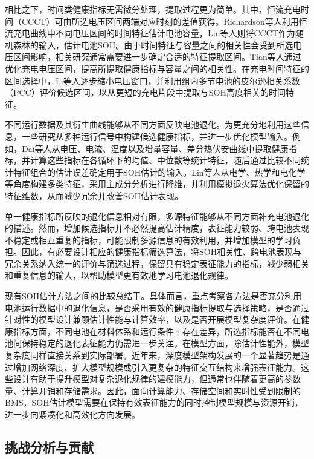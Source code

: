相比之下，时间类健康指标无需微分处理，提取过程更为简单。其中，恒流充电时间（CCCT）可由所选电压区间两端对应时刻的差值获得。Richardson等人\cite{ref28}利用恒流充电曲线中不同电压区间的时间特征估计电池容量，Lin等人\cite{ref63}则将CCCT作为随机森林的输入，估计电池SOH。由于时间特征与容量之间的相关性会受到所选电压区间影响，相关研究通常需要进一步确定合适的特征提取区间。Tian等人\cite{ref51}通过优化充电电压区间，提高所提取健康指标与容量之间的相关性。在充电时间特征的区间选择中，Li等人\cite{ref31}逐步缩小电压窗口，并利用组内多节电池的皮尔逊相关系数（PCC）评价候选区间，以从更短的充电片段中提取与SOH高度相关的时间特征。

不同运行数据及其衍生曲线能够从不同方面反映电池退化。为更充分地利用这些信息，一些研究从多种运行信号中构建候选健康指标，并进一步优化模型输入。例如，Dai等人\cite{ref48}从电压、电流、温度以及增量容量、差分热伏安曲线中提取健康指标，并计算这些指标在各循环下的均值、中位数等统计特征，随后通过比较不同统计特征组合的估计误差确定用于SOH估计的输入。Lin等人\cite{ref55}从电学、热学和电化学等角度构建多类特征，采用主成分分析进行降维，并利用模拟退火算法优化保留的特征维数，从而减少冗余并改善SOH估计表现。

单一健康指标所反映的退化信息相对有限，多源特征能够从不同方面补充电池退化的描述。然而，增加候选指标并不必然提高估计精度，表征能力较弱、跨电池表现不稳定或相互重复的指标，可能限制多源信息的有效利用，并增加模型的学习负担。因此，有必要设计相应的健康指标筛选算法，将SOH相关性、跨电池表现与冗余关系纳入统一的评价与筛选过程，保留具有稳定表征能力的指标，减少弱相关和重复信息的输入，以帮助模型更有效地学习电池退化规律。

现有SOH估计方法之间的比较总结于。具体而言，重点考察各方法是否充分利用电池运行数据中的退化信息，是否采用有效的健康指标提取与选择策略，是否通过针对性的模型设计兼顾估计性能与计算效率，以及是否开展模型复杂度评价。在健康指标方面，不同电池在材料体系和运行条件上存在差异，所选指标能否在不同电池间保持稳定的退化表征能力仍需进一步关注。在模型方面，除估计性能外，模型复杂度同样直接关系到实际部署。近年来，深度模型架构发展的一个显著趋势是通过增加网络深度、扩大模型规模或引入更复杂的特征交互结构来增强表征能力。这些设计有助于提升模型对复杂退化规律的建模能力，但通常也伴随着更高的参数量、计算开销和存储需求。因此，面向计算能力、存储空间和实时性受到限制的BMS，SOH估计模型需要在保持有效表征能力的同时控制模型规模与资源开销，进一步向紧凑化和高效化方向发展。


\FloatBarrier

\subsection{挑战分析与贡献}

